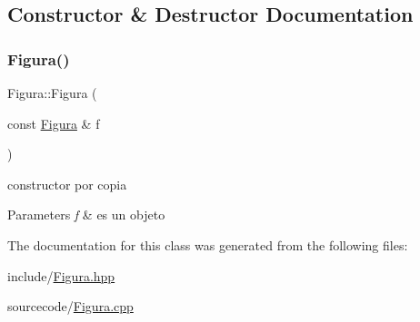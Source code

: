 \subsection{Constructor \& Destructor Documentation}
\mbox{\label{class_figura_a2f55faa2fd40a5ebb2c5d1c958927f2a}} 
\subsubsection{\texorpdfstring{Figura()}{Figura()}}
{\footnotesize\ttfamily Figura\+::\+Figura (\begin{DoxyParamCaption}\item[{const \hyperlink{class_figura}{Figura} \&}]{f }\end{DoxyParamCaption})}



constructor por copia 


\begin{DoxyParams}{Parameters}
{\em f} & es un objeto \\
\hline
\end{DoxyParams}


The documentation for this class was generated from the following files\+:\begin{DoxyCompactItemize}
\item 
include/\hyperlink{_figura_8hpp}{Figura.\+hpp}\item 
sourcecode/\hyperlink{_figura_8cpp}{Figura.\+cpp}\end{DoxyCompactItemize}
